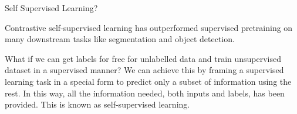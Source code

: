 \documentclass{beamer}
\begin{document}
	\begin{frame}[t]{Self Supervised Learning?}\vspace{10pt}
		
		Contrastive self-supervised learning has outperformed supervised pretraining on many downstream tasks like segmentation and object detection.
		
		What if we can get labels for free for unlabelled data and train unsupervised dataset in a supervised manner? We can achieve this by framing a supervised learning task in a special form to predict only a subset of information using the rest. In this way, all the information needed, both inputs and labels, has been provided. This is known as self-supervised learning.
		
	\end{frame}
	
\end{document}
